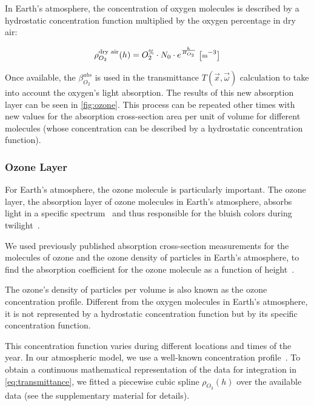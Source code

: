 \documentclass[journal]{vgtc}                %
\begin{document}
In Earth's atmosphere, the concentration of oxygen molecules is described by a hydrostatic concentration function multiplied by the oxygen percentage in dry air:

\vspace*{-2.5mm}
\begin{equation} \label{eq:oxygen-density}
  \small
  \rho^{\text{dry air}}_{O_2}(h) = O_2^{\%}\cdot N_0 \cdot e^{\frac{h}{H_{O_2}}}\ \big[\text{m}^{-3}\big]
\end{equation}

Once available, the $\beta^{abs}_{O_2}$ is used in the transmittance $T(\vec{x}, \vec{\omega})$ calculation to take into account the oxygen's light absorption. The results of this new absorption layer can be seen in \autoref{fig:ozone}. This process can be repeated other times with new values for the absorption cross-section area per unit of volume for different molecules (whose concentration can be described by a hydrostatic concentration function).

\vspace*{-2mm}
\subsubsection{Ozone Layer}\label{section:Ozone}

For Earth's atmosphere, the ozone molecule is particularly important. The ozone layer, the absorption layer of ozone molecules in Earth's atmosphere, absorbs light in a specific spectrum~\cite{Horshelev:2014, Serdyuchenko:2014} and thus responsible for the bluish colors during twilight~\cite{Adams:1974}.

We used previously published absorption cross-section measurements for the molecules of ozone and the ozone density of particles in Earth's atmosphere, to find the absorption coefficient for the ozone molecule as a function of height~\cite{Keller:2013, Hannelore:2013}.

The ozone's density of particles per volume is also known as the ozone concentration profile. Different from the oxygen molecules in Earth's atmosphere, it is not represented by a hydrostatic concentration function but by its specific concentration function. 

This concentration function varies during different locations and times of the year. In our atmospheric model, we use a well-known concentration profile~\cite{US_atmosphere:1976}. To obtain a continuous mathematical representation of the data for integration in \autoref{eq:transmittance}, we fitted a piecewise cubic spline $\rho_{O_3}(h)$ over the available data (see the supplementary material for details).
\end{document}
